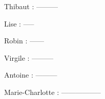
Thibaut :
---------


Lise :
-----


Robin :
------


Virgile :
---------


Antoine :
---------


Marie-Charlotte :
-----------------
